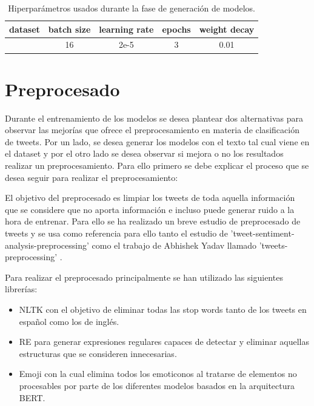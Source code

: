 \begin{table}[H]
\begin{tabular}{|l|c|c|c|c|}
\hline
\rowcolor[HTML]{9B9B9B} 
{\color[HTML]{000000} \textbf{dataset}}              
& {\color[HTML]{000000} \textbf{batch size}} 
& {\color[HTML]{000000} \textbf{learning rate}} 
& {\color[HTML]{000000} \textbf{epochs}} 
& {\color[HTML]{000000} \textbf{weight decay}} 
\\ \hline
\rowcolor[HTML]{C0C0C0} 
\cellcolor[HTML]{9B9B9B}{\color[HTML]{000000} \textbf{Base}} 
& {\color[HTML]{000000} 16}               
& {\color[HTML]{000000} 2e-5}                  
& {\color[HTML]{000000} 3}             
& {\color[HTML]{000000} 0.01}                  
\\ \hline
\end{tabular}
\caption{Hiperparámetros usados durante la fase de generación de modelos.}
\end{table}


\section{Preprocesado} \label{preprocesado}

Durante el entrenamiento de los modelos se desea plantear dos alternativas para observar las mejorías que ofrece el preprocesamiento en materia de clasificación de tweets. Por un lado, se desea generar los modelos con el texto tal cual viene en el dataset y por el otro lado se desea observar si mejora o no los resultados realizar un preprocesamiento. Para ello primero se debe explicar el proceso que se desea seguir para realizar el preprocesamiento:

El objetivo del preprocesado es limpiar los tweets de toda aquella información que se considere que no aporta información e incluso puede generar ruido a la hora de entrenar. Para ello se ha realizado un breve estudio de preprocesado de tweets y se usa como referencia para ello tanto el estudio de 'tweet-sentiment-analysis-preprocessing' \cite{prepro1} como el trabajo de Abhishek Yadav llamado 'tweets-preprocessing' \cite{prepro2}.

Para realizar el preprocesado principalmente se han utilizado las siguientes librerías:
\begin{itemize}
                \item NLTK \cite{nltk} con el objetivo de eliminar todas las stop words tanto de los tweets en español como los de inglés.
                \item RE \cite{python_re} para generar expresiones regulares capaces de detectar y eliminar aquellas estructuras que se consideren innecesarias.
                \item Emoji \cite{python_emoji} con la cual elimina todos los emoticonos al tratarse de elementos no procesables por parte de los diferentes modelos basados en la arquitectura BERT.
            \end{itemize}


